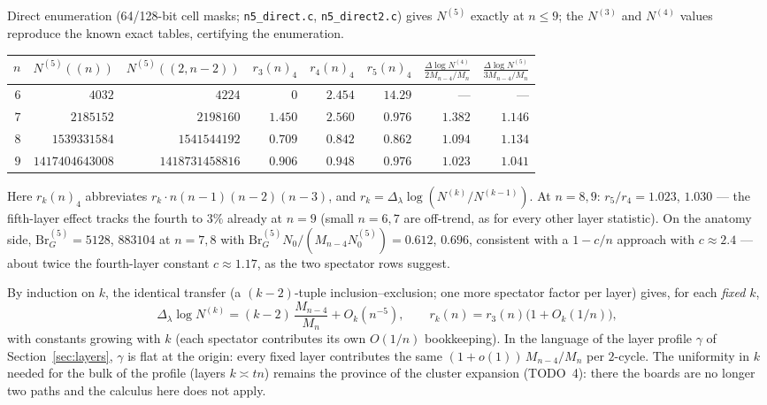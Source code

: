 Direct enumeration (64/128-bit cell masks; \texttt{n5\_direct.c},
\texttt{n5\_direct2.c}) gives $N^{(5)}$ exactly at $n\le9$; the $N^{(3)}$
and $N^{(4)}$ values reproduce the known exact tables, certifying the
enumeration.

\begin{center}
\begin{tabular}{r|rr|rrr|rr}
$n$ & $N^{(5)}((n))$ & $N^{(5)}((2,n{-}2))$ &
$r_3(n)_4$ & $r_4(n)_4$ & $r_5(n)_4$ &
$\frac{\Delta\log N^{(4)}}{2M_{n-4}/M_n}$ &
$\frac{\Delta\log N^{(5)}}{3M_{n-4}/M_n}$\\\hline
$6$ & $4032$ & $4224$ & $0$ & $2.454$ & $14.29$ & --- & ---\\
$7$ & $2185152$ & $2198160$ & $1.450$ & $2.560$ & $0.976$ & $1.382$ & $1.146$\\
$8$ & $1539331584$ & $1541544192$ & $0.709$ & $0.842$ & $0.862$ & $1.094$ & $1.134$\\
$9$ & $1417404643008$ & $1418731458816$ & $0.906$ & $0.948$ & $0.976$ & $1.023$ & $1.041$\\
\end{tabular}
\end{center}

\noindent Here $r_k(n)_4$ abbreviates $r_k\cdot n(n{-}1)(n{-}2)(n{-}3)$,
and $r_k=\Delta_\lambda\log(N^{(k)}/N^{(k-1)})$.  At $n=8,9$:
$r_5/r_4=1.023$, $1.030$ --- the fifth-layer effect tracks the fourth
to $3\%$ already at $n=9$ (small $n=6,7$ are off-trend, as for every
other layer statistic).  On the anatomy side,
$\mathrm{Br}^{(5)}_G=5128$, $883104$ at $n=7,8$ with
$\mathrm{Br}^{(5)}_G N_0/(M_{n-4}N^{(5)}_0)=0.612$, $0.696$,
consistent with a $1-c/n$ approach with $c\approx2.4$ ---
about twice the fourth-layer constant $c\approx1.17$, as the two
spectator rows suggest.

\begin{remark}\label{rem:layerk}
By induction on $k$, the identical transfer (a $(k{-}2)$-tuple
inclusion--exclusion; one more spectator factor per layer) gives, for
each \emph{fixed} $k$,
\[
\Delta_\lambda\log N^{(k)}=(k-2)\,\frac{M_{n-4}}{M_n}+O_k(n^{-5}),
\qquad
r_k(n)=r_3(n)\bigl(1+O_k(1/n)\bigr),
\]
with constants growing with $k$ (each spectator contributes its own
$O(1/n)$ bookkeeping).  In the language of the layer profile
$\gamma$ of Section~\ref{sec:layers}, $\gamma$ is flat at the origin:
every fixed layer contributes the same $(1+o(1))\,M_{n-4}/M_n$ per
$2$-cycle.  The uniformity in $k$ needed for the bulk of the profile
(layers $k\asymp tn$) remains the province of the cluster expansion
(TODO~4): there the boards are no longer two paths and the calculus
here does not apply.
\end{remark}
